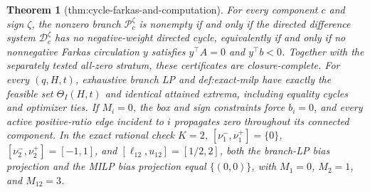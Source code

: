 \documentclass{article}
\newtheorem{theorem}{Theorem}
\begin{document}
\begin{theorem}[thm:cycle-farkas-and-computation]\label{thm:cycle-farkas-and-computation}
For every component \(c\) and sign \(\zeta\), the nonzero branch \(\mathcal P_c^{\zeta}\) is nonempty if and only if the directed difference system \(\mathcal D_c^{\zeta}\) has no negative-weight directed cycle, equivalently if and only if no nonnegative Farkas circulation \(y\) satisfies \(y^\top A=0\) and \(y^\top b<0\). Together with the separately tested all-zero stratum, these certificates are closure-complete. For every \((q,H,t)\), exhaustive branch LP and def:exact-milp have exactly the feasible set \(\Theta_I(H,t)\) and identical attained extrema, including equality cycles and optimizer ties. If \(M_i=0\), the box and sign constraints force \(b_i=0\), and every active positive-ratio edge incident to \(i\) propagates zero throughout its connected component. In the exact rational check \(K=2\), \([\nu^-_1,\nu^+_1]=\{0\}\), \([\nu^-_2,\nu^+_2]=[-1,1]\), and \([\ell_{12},u_{12}]=[1/2,2]\), both the branch-LP bias projection and the MILP bias projection equal \(\{(0,0)\}\), with \(M_1=0\), \(M_2=1\), and \(M_{12}=3\).
\end{theorem}
\end{document}
